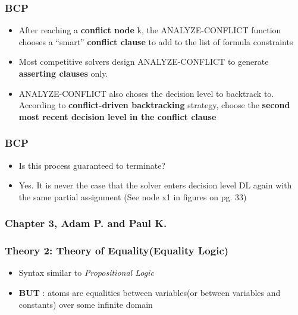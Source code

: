 \documentclass{beamer}
\begin{document}
\begin{frame}

 \frametitle{BCP}
 
 \begin{itemize}
 
 \item  After reaching a \textbf{conflict node} k, the ANALYZE-CONFLICT function chooses a ``smart'' \textbf{conflict clause} to add to the list of formula constraints
 
 \item Most competitive solvers design ANALYZE-CONFLICT to generate \textbf{asserting clauses} only.
 \item ANALYZE-CONFLICT also choses the decision level to backtrack to.  According to \textbf{conflict-driven backtracking} strategy, choose the \textbf{second most recent decision level in the conflict clause}
 \end{itemize}
 
\end{frame}

\begin{frame}

 \frametitle{BCP}
 
 \begin{itemize}
 
 \item  Is this process guaranteed to terminate?
 \item  Yes.  It is never the case that the solver enters decision level DL again with the same partial assignment (See node x1 in figures on pg. 33)
 
 \end{itemize}
 
\end{frame}


\begin{frame}
 \frametitle {Chapter 3, Adam P. and Paul K.}
\end{frame}

\begin{frame}

 \frametitle{Theory 2:  Theory of Equality(Equality Logic)}
 
 \begin{itemize}
 \item Syntax similar to \emph{Propositional Logic} 
 \item \textbf{BUT} : atoms are equalities between variables(or between variables and constants) over some infinite domain

 \end{itemize}
 
\end{frame}
\end{document}
